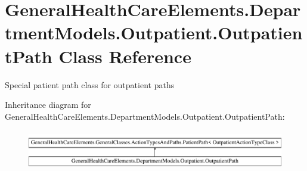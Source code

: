 \hypertarget{class_general_health_care_elements_1_1_department_models_1_1_outpatient_1_1_outpatient_path}{}\section{General\+Health\+Care\+Elements.\+Department\+Models.\+Outpatient.\+Outpatient\+Path Class Reference}
\label{class_general_health_care_elements_1_1_department_models_1_1_outpatient_1_1_outpatient_path}


Special patient path class for outpatient paths  


Inheritance diagram for General\+Health\+Care\+Elements.\+Department\+Models.\+Outpatient.\+Outpatient\+Path\+:\begin{figure}[H]
\begin{center}
\leavevmode
\includegraphics[height=1.741835cm]{class_general_health_care_elements_1_1_department_models_1_1_outpatient_1_1_outpatient_path}
\end{center}
\end{figure}
